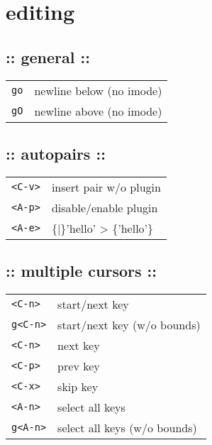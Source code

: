 \section{\hrulefill editing\hrulefill}
\subsection{:: general ::}
\begin{tabular}{@{}ll@{}}
    \verb!go!       & newline below (no imode) \\
    \verb!gO!       & newline above (no imode) \\
\end{tabular}

\subsection{:: autopairs ::}
\begin{tabular}{@{}ll@{}}
    \verb!<C-v>!    & insert pair w/o plugin \\
    \verb!<A-p>!    & disable/enable plugin \\
    \verb!<A-e>!    & \{|\}'hello' > \{'hello'\} \\
\end{tabular}

\subsection{:: multiple cursors ::}
\begin{tabular}{@{}ll@{}}
    \verb!<C-n>!    & start/next key \\
    \verb!g<C-n>!   & start/next key (w/o bounds) \\
    \verb!<C-n>!    & next key \\
    \verb!<C-p>!    & prev key \\
    \verb!<C-x>!    & skip key \\
    \verb!<A-n>!    & select all keys \\
    \verb!g<A-n>!   & select all keys (w/o bounds) \\
\end{tabular}

